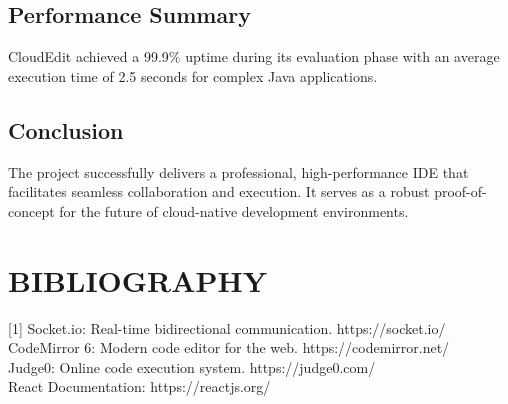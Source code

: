 \documentclass[12pt,a4paper]{report}
\begin{document}
\section{Performance Summary}
CloudEdit achieved a 99.9\% uptime during its evaluation phase with an average execution time of 2.5 seconds for complex Java applications.
\section{Conclusion}
The project successfully delivers a professional, high-performance IDE that facilitates seamless collaboration and execution. It serves as a robust proof-of-concept for the future of cloud-native development environments.

\newpage

\chapter*{BIBLIOGRAPHY}
[1] Socket.io: Real-time bidirectional communication. https://socket.io/ \\
[2] CodeMirror 6: Modern code editor for the web. https://codemirror.net/ \\
[3] Judge0: Online code execution system. https://judge0.com/ \\
[4] React Documentation: https://reactjs.org/
\end{document}
